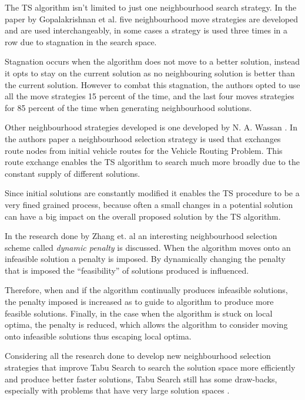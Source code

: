 The TS algorithm isn't limited to just one neighbourhood search strategy. In the paper by Gopalakrishnan et al.\cite{TabuCarryOver} five neighbourhood move strategies are developed and are used interchangeably, in some cases a strategy is used three times in a row due to stagnation in the search space. 

Stagnation occurs when the algorithm does not move to a better solution, instead it opts to stay on the current solution as no neighbouring solution is better than the current solution. However to combat this stagnation, the authors opted to use all the move strategies 15 percent of the time, and the last four moves strategies for 85 percent of the time when generating neighbourhood solutions.

Other neighbourhood strategies developed is one developed by N. A. Wassan \cite{ReactiveTabuVHR}. In the authors paper a neighbourhood selection strategy is used that exchanges route nodes from initial vehicle routes for the Vehicle Routing Problem. This route exchange enables the TS algorithm to search much more broadly due to the constant supply of different solutions. 

Since initial solutions are constantly modified it enables the TS procedure to be a very fined grained process, because often a small changes in a potential solution can have a big impact on the overall proposed solution by the TS algorithm.

In the research done by Zhang et. al \cite{TSHazardous} an interesting neighbourhood selection scheme called \emph{dynamic penalty} is discussed. When the algorithm moves onto an infeasible solution a penalty is imposed. By dynamically changing the penalty that is imposed the ``feasibility'' of solutions produced is influenced. 

Therefore, when and if the algorithm continually produces infeasible solutions, the penalty imposed is increased as to guide to algorithm to produce more feasible solutions. Finally, in the case when the algorithm is stuck on local optima, the penalty is reduced, which allows the algorithm to consider moving onto infeasible solutions thus escaping local optima.

Considering all the research done to develop new neighbourhood selection strategies that improve Tabu Search to search the solution space more efficiently and produce better faster solutions, Tabu Search still has some draw-backs, especially with problems that have very large solution spaces \cite{EvoParallelTabu}.

